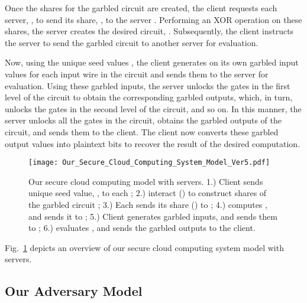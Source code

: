 \documentclass[10pt,journal,cspaper,compsoc]{IEEEtran}
\begin{document}
Once the shares for the garbled circuit are created, the client requests each server, , to send its share, , to the server . Performing an XOR operation on these shares, the server  creates the desired circuit, . Subsequently, the client instructs the server  to send the garbled circuit  to another server  for evaluation.



Now, using the unique seed values , the client generates on its own garbled input values for each input wire in the circuit and sends them to the server  for evaluation. Using these garbled inputs, the server  unlocks the gates in the first level of the circuit to obtain the corresponding garbled outputs, which, in turn, unlocks the gates in the second level of the circuit, and so on. In this manner, the server  unlocks all the gates in the circuit, obtains the garbled outputs of the circuit, and sends them to the client. The client now converts these garbled output values into plaintext bits to recover the result of the desired computation.


\begin{figure}[t]
\centering
\texttt{[image: Our\_Secure\_Cloud\_Computing\_System\_Model\_Ver5.pdf]}
\vspace{-3 mm}
\caption{Our secure cloud computing model with  servers. 1.) Client sends unique seed value, , to each ; 2.)  interact () to construct shares of the garbled circuit ; 3.) Each  sends its share () to ; 4.)  computes , and sends it to ; 5.) Client generates garbled inputs, and sends them to ; 6.)  evaluates , and sends the garbled outputs to the client.\vspace{-4 mm}}
\label{fig_our_secure_cloud_computing_Model}
\end{figure}


Fig.~\ref{fig_our_secure_cloud_computing_Model} depicts an overview of our secure cloud computing system model with  servers.


\subsection{Our Adversary Model}
\label{sec_adversary_model}
\end{document}

